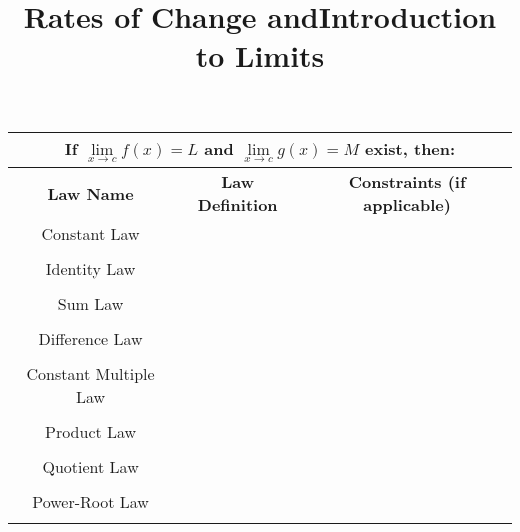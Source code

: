 \documentclass{siproblemset}
\title{Rates of Change and\linebreak Introduction to Limits}
\begin{document}
    \maketitle
    
    
    \tinyspace
    
    \tinyspace
    
    \begin{center}
        \begin{tabular}{ |c|c|c| } 
            \hline
            \multicolumn{3}{|c|}{If $\lim\limits_{x\to c}f(x)=L$ and $\lim\limits_{x\to c}g(x)=M$ exist, then:}\\[4ex]
            \hline
            \textbf{Law Name} & \textbf{Law Definition} & \textbf{Constraints (if applicable)} \\ 
            \hline
            Constant Law & \hspace{3in} & \\ 
            &&\\
            \hline
            Identity Law & \hspace{3in} & \\ 
            &&\\
            \hline
            Sum Law & \hspace{3in} & \\ 
            &&\\
            \hline
            Difference Law & \hspace{3in} & \\ 
            &&\\
            \hline
            Constant Multiple Law & \hspace{3in} & \\ 
            &&\\
            \hline
            Product Law & \hspace{3in} & \\ 
            &&\\
            \hline
            Quotient Law & \hspace{3in} & \\ 
            &&\\
            \hline
            Power-Root Law & \hspace{3in} & \\ 
            &&\\
            \hline
        \end{tabular}
    \end{center}
    \pagebreak
    
\end{document}

